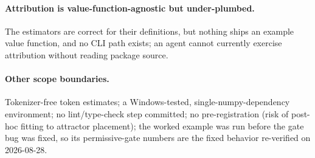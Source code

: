 \paragraph{Attribution is value-function-agnostic but under-plumbed.}
The estimators are correct for their definitions, but nothing ships an example
value function, and no CLI path exists; an agent cannot currently exercise
attribution without reading package source.

\paragraph{Other scope boundaries.}
Tokenizer-free token estimates; a Windows-tested, single-numpy-dependency
environment; no lint/type-check step committed; no pre-registration (risk of
post-hoc fitting to attractor placement); the worked example was run before the
gate bug was fixed, so its permissive-gate numbers are the fixed behavior
re-verified on 2026-08-28.